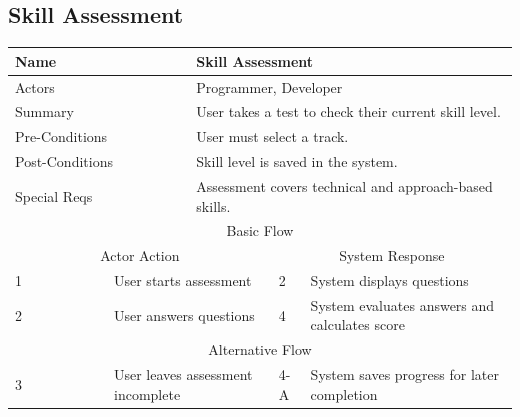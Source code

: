 \documentclass{FastFyp}
\begin{document}
\vspace{1em}

\subsection{Skill Assessment}
\noindent
\begin{minipage}{\textwidth}
\centering
{}
\label{tab:skill}
\begin{tabular}{|p{}|p{}|p{}|p{}|p{}|}
\hline
\multicolumn{2}{|p{0.15\textwidth}|}{Name} &
  \multicolumn{3}{p{0.75\textwidth}|}{Skill Assessment} \\ \hline
\multicolumn{2}{|p{0.15\textwidth}|}{Actors} &
  \multicolumn{3}{p{0.75\textwidth}|}{Programmer, Developer} \\ \hline
\multicolumn{2}{|p{0.15\textwidth}|}{Summary} &
  \multicolumn{3}{p{0.75\textwidth}|}{User takes a test to check their current skill level.} \\ \hline
\multicolumn{2}{|p{0.15\textwidth}|}{Pre-Conditions} &
  \multicolumn{3}{p{0.75\textwidth}|}{User must select a track.} \\ \hline
\multicolumn{2}{|p{0.15\textwidth}|}{Post-Conditions} &
  \multicolumn{3}{p{0.75\textwidth}|}{Skill level is saved in the system.} \\ \hline
\multicolumn{2}{|p{0.15\textwidth}|}{Special Reqs} &
  \multicolumn{3}{p{0.75\textwidth}|}{Assessment covers technical and approach-based skills.} \\ \hline
\multicolumn{5}{|c|}{Basic Flow} \\ \hline
\multicolumn{3}{|c|}{Actor Action} &
  \multicolumn{2}{c|}{System Response} \\ \hline
1 &
  \multicolumn{2}{p{0.42\textwidth}|}{User starts assessment} &
  2 &
  System displays questions \\ \hline
2 &
  \multicolumn{2}{p{0.42\textwidth}|}{User answers questions} &
  4 &
  System evaluates answers and calculates score \\ \hline
\multicolumn{5}{|c|}{Alternative Flow} \\ \hline
3 &
  \multicolumn{2}{p{0.42\textwidth}|}{User leaves assessment incomplete} &
  4-A &
  System saves progress for later completion \\ \hline
\end{tabular}
\end{minipage}
\end{document}
